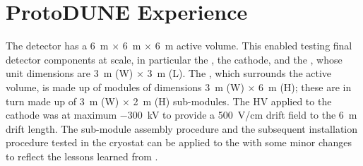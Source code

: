 \clearpage
\section{ProtoDUNE Experience}
\label{sec:fddp-hv-protodune}


The  detector has a \SI{6}{\m} $\times$ \SI{6}{\m} $\times$ \SI{6}{\m} active volume. This enabled testing final detector components at scale, in particular the , the cathode, and the , whose unit dimensions are \SI{3}{\m} (W) $\times$ \SI{3}{\m} (L). The , which surrounds the active volume, is made up of modules of dimensions \SI{3}{\m} (W) $\times$ \SI{6}{\m} (H); these are in turn made up of \SI{3}{\m} (W) $\times$ \SI{2}{\m} (H) sub-modules.  The HV applied to the cathode was at maximum \SI{-300}{\kV} to provide a \SI{500}{\V/\cm} drift field to the \SI{6}{\m} drift length.  The sub-module assembly procedure and the subsequent installation procedure tested in the cryostat can be applied to the  with some minor changes to reflect the lessons learned from . 

